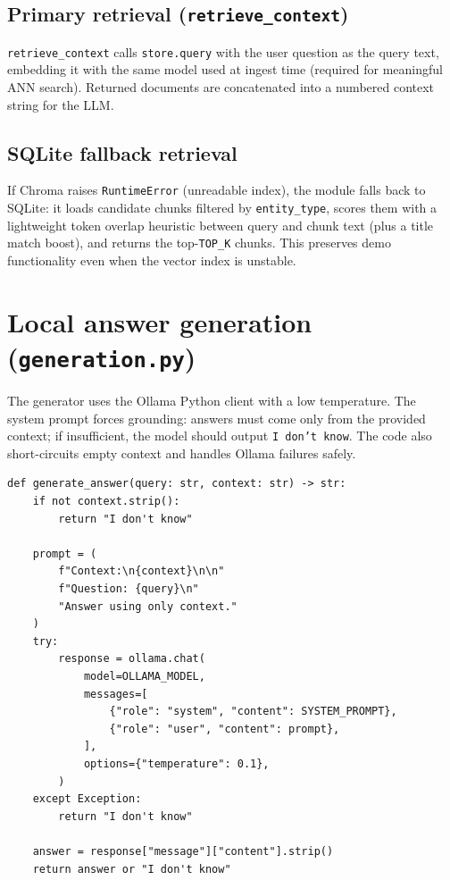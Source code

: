 \documentclass[11pt,a4paper]{article}
\begin{document}
\subsection{Primary retrieval (\texttt{retrieve\_context})}
\texttt{retrieve\_context} calls \texttt{store.query} with the user question as the query
text, embedding it with the same model used at ingest time (required for meaningful ANN
search). Returned documents are concatenated into a numbered context string for the LLM.

\subsection{SQLite fallback retrieval}
If Chroma raises \texttt{RuntimeError} (unreadable index), the module falls back to SQLite:
it loads candidate chunks filtered by \texttt{entity\_type}, scores them with a lightweight
token overlap heuristic between query and chunk text (plus a title match boost), and
returns the top-\texttt{TOP\_K} chunks. This preserves demo functionality even when the
vector index is unstable.

\section{Local answer generation (\texttt{generation.py})}

The generator uses the Ollama Python client with a low temperature. The system prompt
forces grounding: answers must come only from the provided context; if insufficient, the
model should output \texttt{I don't know}. The code also short-circuits empty context and
handles Ollama failures safely.

\begin{lstlisting}[caption={Grounded generation with Ollama (\texttt{generation.py}).},label={lst:gen}]
def generate_answer(query: str, context: str) -> str:
    if not context.strip():
        return "I don't know"

    prompt = (
        f"Context:\n{context}\n\n"
        f"Question: {query}\n"
        "Answer using only context."
    )
    try:
        response = ollama.chat(
            model=OLLAMA_MODEL,
            messages=[
                {"role": "system", "content": SYSTEM_PROMPT},
                {"role": "user", "content": prompt},
            ],
            options={"temperature": 0.1},
        )
    except Exception:
        return "I don't know"

    answer = response["message"]["content"].strip()
    return answer or "I don't know"
\end{lstlisting}
\end{document}
